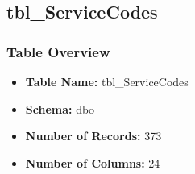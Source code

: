 \begin{landscape}
\subsection{tbl\_ServiceCodes}

\subsubsection{Table Overview}
\begin{itemize}
\item \textbf{Table Name:} tbl\_ServiceCodes
\item \textbf{Schema:} dbo
\item \textbf{Number of Records:} 373
\item \textbf{Number of Columns:} 24
\end{itemize}


\end{landscape}
